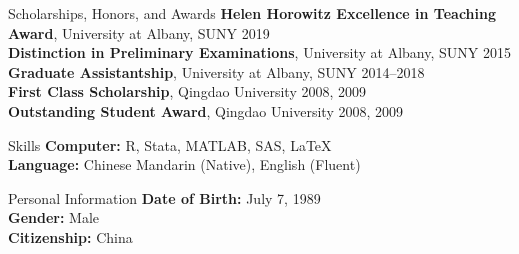 \documentclass{resume_liang} %
\begin{document}
\begin{rSection}{Scholarships, Honors, and Awards} 
{\bf Helen Horowitz Excellence in Teaching Award}{, University at Albany, SUNY} \hfill{2019}  \vspace{0.1cm}\\ 
{\bf Distinction in Preliminary Examinations}{, University at Albany, SUNY} \hfill{2015}  \vspace{0.1cm}\\
{\bf Graduate Assistantship}{, University at Albany, SUNY} \hfill{2014--2018}  
\vspace{0.1cm}\\
{\bf First Class Scholarship}{, Qingdao University} \hfill{2008, 2009} 
\vspace{0.1cm}\\
{\bf Outstanding Student Award}{, Qingdao University} \hfill{2008, 2009}  
\vspace{0.1cm}\\
\end{rSection}
\bigskip  




\begin{rSection}{Skills}
{\bf Computer:} R, Stata, MATLAB, SAS, LaTeX 
\vspace{0.1cm} \\
{\bf Language:} Chinese Mandarin (Native), English (Fluent) 
\\
\end{rSection}
\bigskip  




\begin{rSection}{Personal Information }
{\bf Date of Birth:} July 7, 1989  
\vspace{0.1cm} \\
{\bf Gender:} Male  
\vspace{0.1cm} \\
{\bf Citizenship:} China  
\\
\end{rSection}
\bigskip
\end{document}
